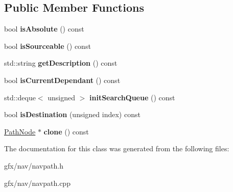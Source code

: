 \subsection*{Public Member Functions}
\begin{DoxyCompactItemize}
\item 
bool {\bfseries is\+Absolute} () const \hypertarget{classCurrentPathNode_a5492802bd4284189b2dc1cfc0018ff18}{}\label{classCurrentPathNode_a5492802bd4284189b2dc1cfc0018ff18}

\item 
bool {\bfseries is\+Sourceable} () const \hypertarget{classCurrentPathNode_af877b629e897af43763b91b27b29c073}{}\label{classCurrentPathNode_af877b629e897af43763b91b27b29c073}

\item 
std\+::string {\bfseries get\+Description} () const \hypertarget{classCurrentPathNode_a3cf687da0af6c235952139d795afe3e6}{}\label{classCurrentPathNode_a3cf687da0af6c235952139d795afe3e6}

\item 
bool {\bfseries is\+Current\+Dependant} () const \hypertarget{classCurrentPathNode_a09680b937c0b6e005058019a688558a3}{}\label{classCurrentPathNode_a09680b937c0b6e005058019a688558a3}

\item 
std\+::deque$<$ unsigned $>$ {\bfseries init\+Search\+Queue} () const \hypertarget{classCurrentPathNode_a6b3710e96a66ea303d6f8748b4d8ea89}{}\label{classCurrentPathNode_a6b3710e96a66ea303d6f8748b4d8ea89}

\item 
bool {\bfseries is\+Destination} (unsigned index) const \hypertarget{classCurrentPathNode_a39059fc6fb5b03849f85b3a0973cf93b}{}\label{classCurrentPathNode_a39059fc6fb5b03849f85b3a0973cf93b}

\item 
\hyperlink{classPathNode}{Path\+Node} $\ast$ {\bfseries clone} () const \hypertarget{classCurrentPathNode_a38175eccd85a30d60fd02ee22ca7b4ed}{}\label{classCurrentPathNode_a38175eccd85a30d60fd02ee22ca7b4ed}

\end{DoxyCompactItemize}


The documentation for this class was generated from the following files\+:\begin{DoxyCompactItemize}
\item 
gfx/nav/navpath.\+h\item 
gfx/nav/navpath.\+cpp\end{DoxyCompactItemize}
